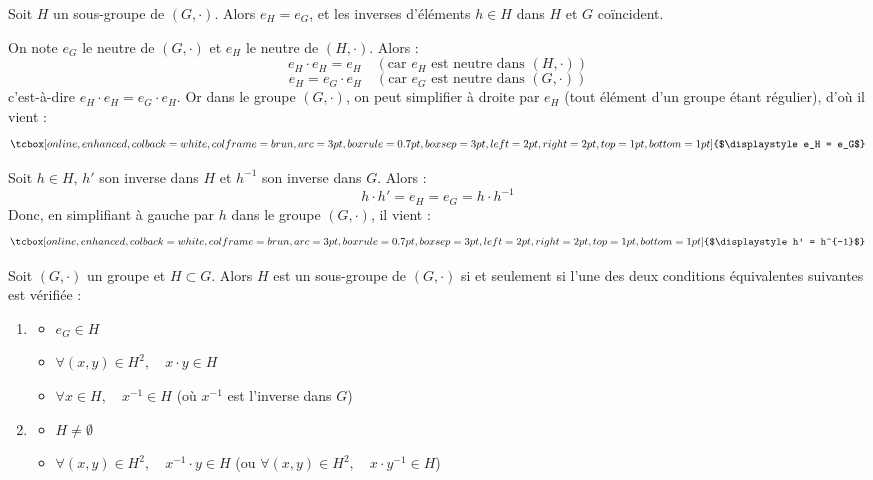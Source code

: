 \documentclass[a4paper,11pt]{article}
\newcommand{\cadre}[1]{%
  \tcbox[on line,enhanced,colback=white,colframe=brun,arc=3pt,boxrule=0.7pt,
         boxsep=3pt,left=2pt,right=2pt,top=1pt,bottom=1pt]{$\displaystyle #1$}}
\begin{document}
\begin{lemme}
Soit $H$ un sous-groupe de $(G, \cdot)$. Alors $e_H = e_G$, et les inverses d'éléments $h \in H$ dans $H$ et $G$ coïncident.
\end{lemme}

\begin{demonstration}
On note $e_G$ le neutre de $(G, \cdot)$ et $e_H$ le neutre de $(H, \cdot)$. Alors :
\[
e_H \cdot e_H = e_H \quad (\text{car } e_H \text{ est neutre dans } (H, \cdot))
\]
\[
e_H = e_G \cdot e_H \quad (\text{car } e_G \text{ est neutre dans } (G, \cdot))
\]
c'est-à-dire $e_H \cdot e_H = e_G \cdot e_H$. Or dans le groupe $(G, \cdot)$, on peut simplifier à droite par $e_H$ (tout élément d'un groupe étant régulier), d'où il vient :
\[
\cadre{e_H = e_G}
\]

Soit $h \in H$, $h'$ son inverse dans $H$ et $h^{-1}$ son inverse dans $G$. Alors :
\[
h \cdot h' = e_H = e_G = h \cdot h^{-1}
\]
Donc, en simplifiant à gauche par $h$ dans le groupe $(G, \cdot)$, il vient :
\[
\cadre{h' = h^{-1}}
\]
\end{demonstration}

\begin{proposition}
Soit $(G, \cdot)$ un groupe et $H \subset G$. Alors $H$ est un sous-groupe de $(G, \cdot)$ si et seulement si l'une des deux conditions équivalentes suivantes est vérifiée :
\begin{enumerate}
    \item \begin{itemize}
        \item $e_G \in H$
        \item $\forall (x, y) \in H^2, \quad x \cdot y \in H$
        \item $\forall x \in H, \quad x^{-1} \in H$ \quad (où $x^{-1}$ est l'inverse dans $G$)
    \end{itemize}
    \item \begin{itemize}
        \item $H \neq \emptyset$
        \item $\forall (x, y) \in H^2, \quad x^{-1} \cdot y \in H$ \quad (ou $\forall (x, y) \in H^2, \quad x \cdot y^{-1} \in H$)
    \end{itemize}
\end{enumerate}
\end{proposition}
\end{document}
